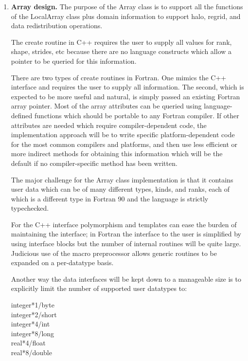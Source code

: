 \begin{enumerate}
\item{\bf Array design.}
The purpose of the Array class is to support all the functions of
the LocalArray class plus domain information to support halo,
regrid, and data redistribution operations.

The create routine in C++ requires the user to supply all values for
rank, shape, strides, etc because there are no language constructs which
allow a pointer to be queried for this information.

There are two types of create routines in Fortran.  One mimics the C++
interface and requires the user to supply all information.  
The second, which is expected to be more useful and natural, 
is simply passed an existing Fortran array pointer.  Most of the
array attributes can be queried using language-defined functions which
should be portable to any Fortran compiler.   If other attributes are needed
which require compiler-dependent code, the implementation approach
will be to write specific platform-dependent code for the most common
compilers and platforms, and then use less efficient or more indirect 
methods for obtaining this information which will be the default if 
no compiler-specific method has been written.

The major challenge for the Array class implementation is that it 
contains user data which can be of many different types, kinds,
and ranks, each of which is a different type in Fortran 90 and
the language is strictly typechecked.

For the C++ interface polymorphism and templates can ease the burden of 
maintaining the interface; in Fortran the interface to the user
is simplified by using interface blocks but the number of internal
routines will be quite large.  Judicious use of the macro preprocessor
allows generic routines to be expanded on a per-datatype basis.

Another way the data interfaces will be kept down to a manageable
size is to explicitly limit the number of supported user datatypes to:
\begin{description}
\item[integer*1/byte]
\item[integer*2/short]
\item[integer*4/int]
\item[integer*8/long]
\item[real*4/float]
\item[real*8/double]
\end{description}



\end{enumerate}
